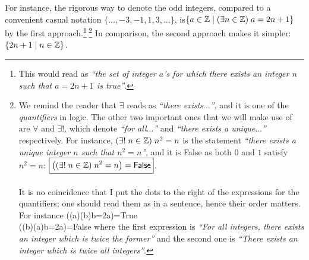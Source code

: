 For instance, the rigorous way to denote the odd integers, compared to a convenient casual notation $\{\dots,-3,-1,1,3,\dots\}$, is\linebreak $\{a\in\mathbb{Z}\;|\;(\exists n\in\mathbb{Z})\;a=2n+1\}$ by the first approach.\footnote{This would read as \emph{``the set of integer $a$'s for which there exists an integer $n$ such that $a=2n+1$ is true''}.\footnotemark}${}^{\;}$\footnote{We remind the reader that $\exists$ reads as \emph{``there exists$\dots$''}, and it is one of the \emph{quantifiers} in logic. The other two important ones that we will make use of are $\forall$ and $\exists !$, which denote \emph{``for all$\dots$''} and \emph{``there exists a unique$\dots$''} respectively. For instance, $(\exists!\;n\in\mathbb{Z})\;n^2=n$ is the statement \emph{``there exists a unique integer $n$ such that $n^2=n$''}, and it is \textsf{False} as both $0$ and $1$ satisfy $n^2=n$: $\boxed{\left((\exists!\;n\in\mathbb{Z})\;n^2=n\right)=\textsf{False}}$.\footnotemark\\\\
It is no coincidence that I put the dots to the right of the expressions for the quantifiers; one should read them as in a sentence, hence their order matters. For instance
\bea 
\Big((\forall a\in\Z)(\exists b\in\Z)\;b=2a\Big)=\textsf{True}\\
\Big((\exists b\in\Z)(\forall a\in\Z)\;b=2a\Big)=\textsf{False}
\eea 
where the first expression is \emph{``For all integers, there exists an integer which is twice the former''} and the second one is \emph{``There exists an integer which is twice all integers''}.
} In comparison, the second approach makes it simpler: $\{2n+1\;|\; n\in\mathbb{Z}\}$.

